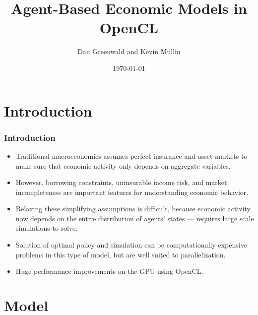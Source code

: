 \documentclass[handout]{beamer}
\title{Agent-Based Economic Models in OpenCL}
\author{Dan Greenwald and Kevin Mullin}
\date{\today}
\newcommand{\E}{\mathbb{E}}
\theoremstyle{definition}
\begin{document}
\small

\frame{\titlepage}

\section{Introduction}

\begin{frame}
  \frametitle{Introduction}
  \begin{itemize}[<+->]
  \item Traditional macroeconomics assumes perfect insurance and asset markets to make sure that economic activity only depends on aggregate variables.
  \item However, borrowing constraints, uninsurable income risk, and market incompleteness are important features for understanding economic behavior.
  \item Relaxing these simplifying assumptions is difficult, because economic activity now depends on the entire distribution of agents' states --- requires large scale simulations to solve.
  \item Solution of optimal policy and simulation can be computationally expensive problems in this type of model, but are well suited to parallelization.
  \item Huge performance improvements on the GPU using OpenCL.
  \end{itemize}
\end{frame}

\section{Model}

\end{document}
